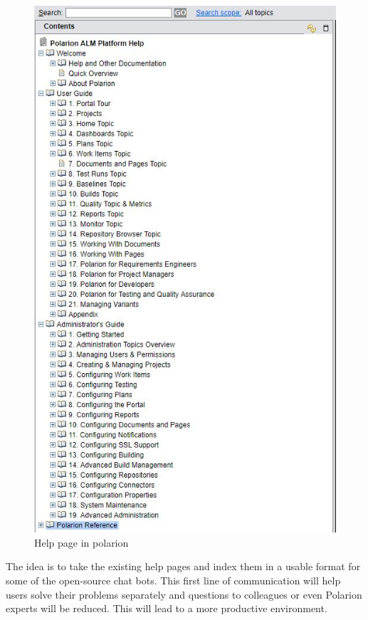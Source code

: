 \documentclass[thesis=M,english]{FITthesis}[2012/06/26]
\begin{document}
\begin{figure}[p!]\centering
	\includegraphics[width=1\textwidth]{pictures/polarion_help}
	\caption{Help page in \acrshort{polarion}}\label{fig:polarion_help}
\end{figure}

The idea is to take the existing help pages and index them in a usable format for some of the open-source chat bots. This first line of communication will help users solve their problems separately and questions to colleagues or even Polarion experts will be reduced. This will lead to a more productive environment.  
\end{document}

